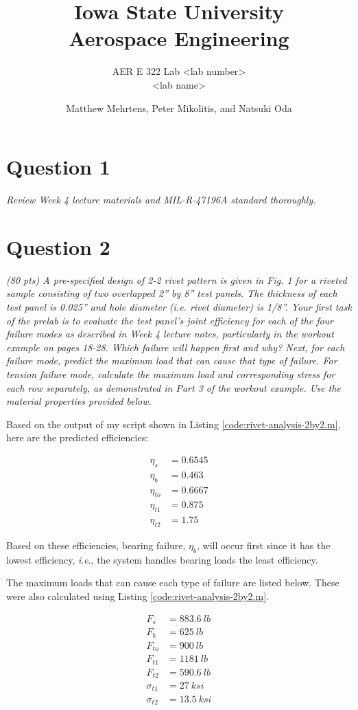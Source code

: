 \documentclass[12 pt]{article}
\title{\textbf{Iowa State University
\\{\Large Aerospace Engineering}}}
\subtitle{AER E 322 Lab <lab number>\\
		  <lab name>}
\author{Matthew Mehrtens, Peter Mikolitis, and Natsuki Oda}
\newcommand{\ie}{\textit{i}.\textit{e}., }
\begin{document}
\section*{Question 1} \label{question_1}
\textit{Review Week 4 lecture materials and MIL-R-47196A standard thoroughly.}

\section*{Question 2} \label{question_2}
\textit{(80 pts) A pre-specified design of 2-2 rivet pattern is given in Fig. 1 for a riveted sample consisting of two overlapped 2” by 8” test panels.  The thickness of each test panel is 0.025” and hole diameter (i.e. rivet diameter) is 1/8”.  Your first task of the prelab is to evaluate the test panel’s joint efficiency for each of the four failure modes as described in Week 4 lecture notes, particularly in the workout example on pages 18-28.  Which failure will happen first and why? Next, for each failure mode, predict the maximum load that can cause that type of failure.  For tension failure mode, calculate the maximum load and corresponding stress for each row separately, as demonstrated in Part 3 of the workout example.  Use the material properties provided below.}

Based on the output of my script shown in Listing \ref{code:rivet-analysis-2by2.m}, here are the predicted efficiencies:

\begin{align*}
\eta_s&=\num{0.6545} \\
\eta_b&=\num{0.463} \\
\eta_{to}&=\num{0.6667} \\
\eta_{t1}&=\num{0.875} \\
\eta_{t2}&=\num{1.75}
\end{align*}

Based on these efficiencies, bearing failure, $\eta_b$, will occur first since it has the lowest efficiency, \ie the system handles bearing loads the least efficiency.

The maximum loads that can cause each type of failure are listed below. These were also calculated using Listing \ref{code:rivet-analysis-2by2.m}.

\begin{align*}
F_s&=\qty{883.6}{lb} \\
F_b&=\qty{625}{lb} \\
F_{to}&=\qty{900}{lb} \\
F_{t1}&=\qty{1181}{lb} \\
F_{t2}&=\qty{590.6}{lb} \\
\sigma_{t1}&=\qty{27}{ksi} \\
\sigma_{t2}&=\qty{13.5}{ksi}
\end{align*}
\end{document}
